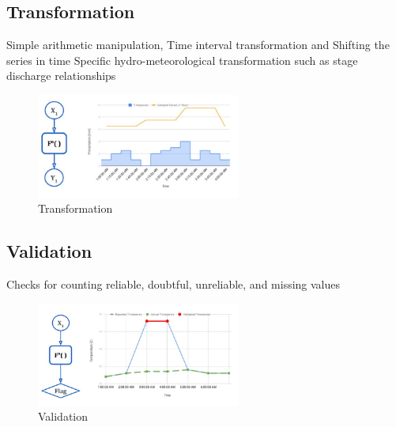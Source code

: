 \subsection{Transformation}
Simple arithmetic manipulation, Time interval transformation and Shifting the series in time
Specific hydro-meteorological transformation such as stage discharge relationships
\begin{figure}[htp]
    \centering
    \includegraphics[width=0.6\textwidth]{method/data_preprocess/transformation.jpg}
    \caption{Transformation}
    \label{fi:transformation}
\end{figure}

\subsection{Validation}
Checks for counting reliable, doubtful, unreliable, and missing values
\begin{figure}[htp]
    \centering
    \includegraphics[width=0.6\textwidth]{method/data_preprocess/validation.jpg}
    \caption{Validation}
    \label{fi:validation}
\end{figure}

